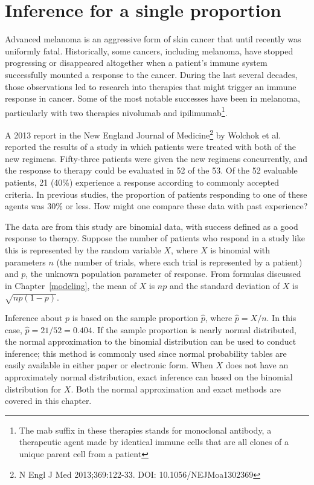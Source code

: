 \section{Inference for a single proportion}
\label{singleProportion}

Advanced melanoma is an aggressive form of skin cancer that until recently was uniformly fatal.  Historically, some cancers, including melanoma, have stopped progressing or disappeared altogether  when a patient's immune system successfully mounted a response to the cancer. During the last several decades, those observations led to research into therapies that might trigger an immune response in cancer.  Some of the most notable successes have been in melanoma, particularly with two therapies nivolumab and ipilimumab\footnote{The mab suffix in these therapies stands for monoclonal antibody, a therapeutic agent made by identical immune cells that are all clones of a unique parent cell from a patient}.

A 2013 report in the New England Journal of Medicine\footnote{N Engl J Med 2013;369:122-33. DOI: 10.1056/NEJMoa1302369} by Wolchok et al. reported the results of a study in which patients were treated with both of the new regimens.  Fifty-three patients were given the new regimens concurrently, and the response to therapy could be evaluated in 52 of the 53.  Of the 52 evaluable patients, 21 (40\%) experience a response according to commonly accepted criteria.  In previous studies, the proportion of patients responding to one of these agents was 30\% or less.  How might one compare these data with past experience?

The data are from this study are binomial data, with success defined as a good response to therapy. Suppose the number of patients who respond in a study like this is represented by the random variable $X$, where $X$ is binomial with parameters $n$ (the number of trials, where each trial is represented by a patient) and $p$, the unknown population parameter of response. From formulas discussed in Chapter~\ref{modeling}, the mean of $X$ is $np$ and the standard deviation of $X$ is $\sqrt{np(1-p)}$.

Inference about $p$ is based on the sample proportion $\hat{p}$, where $\hat{p} = X/n$. In this case, $\hat{p} = 21/52 = 0.404$. If the sample proportion is nearly normal distributed, the normal approximation to the binomial distribution can be used to conduct inference; this method is commonly used since normal probability tables are easily available in either paper or electronic form.  When $X$ does not have an approximately normal distribution, exact inference can  based on the binomial distribution for $X$.  Both the normal approximation and exact methods are covered in this chapter.



